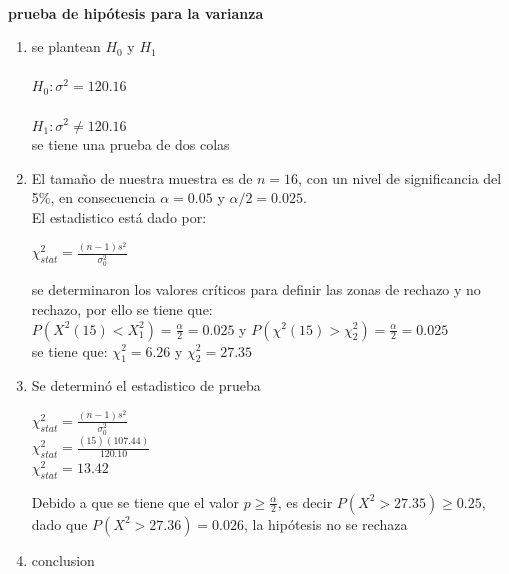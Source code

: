 \documentclass{article}
\begin{document}
\begin{enumerate}
    \paragraph*{}\textbf{prueba de hipótesis para la varianza}\\
    \begin{enumerate}
        \item se plantean $H_0$ y $H_1$
        \paragraph{} $H_0: \sigma^2 = 120.16$
        \paragraph{} $H_1: \sigma^2 \neq 120.16 $\\
        se tiene una prueba de dos colas 
        \item El tamaño de nuestra muestra es de $n=16$, con un nivel de significancia del 5\%, en consecuencia $\alpha = 0.05$ y $\alpha/2 =0.025$.\\
        El estadistico está dado por:\\
        \begin{center}
             $\chi_{stat}^2=\frac{(n-1)s^2}{\sigma_0^2}$\\
        \end{center}
        se determinaron los valores críticos para definir las zonas de rechazo y no rechazo, por ello se tiene que: \\
        $P(X^2(15)<X_1^2)=\frac{\alpha}{2}=0.025$ y $P(\chi^2(15)>\chi_2^2)=\frac{\alpha}{2}=0.025$\\
        se tiene que: $\chi_1^2= 6.26$ y $\chi_2^2= 27.35$
        \item Se determinó el estadistico de prueba \\
        \begin{center}
            $\chi_{stat}^2=\frac{(n-1)s^2}{\sigma_0^2}$\\
            $\chi_{stat}^2=\frac{(15)(107.44)}{120.10}$\\
            $\chi_{stat}^2=13.42$\\
        \end{center}
        Debido a que se tiene que el valor $p\geq \frac{\alpha}{2}$, es decir $P(X^2>27.35)\geq 0.25$, dado que $P(X^2>27.36)=0.026$, la hipótesis no se rechaza 
        \item conclusion
    \end{enumerate}

\end{enumerate}
\end{document}
